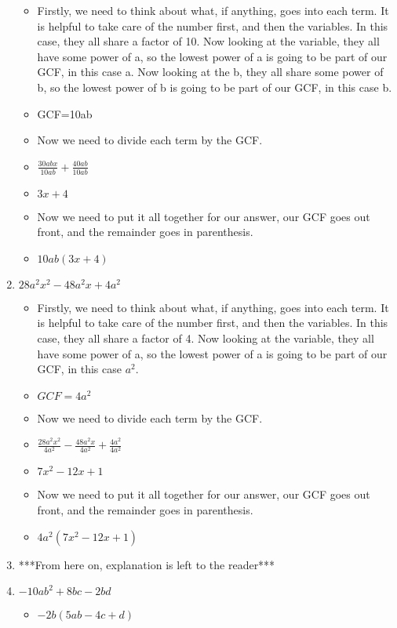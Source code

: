 \documentclass{article}
\begin{document}
\begin{enumerate}
\begin{itemize}
  \item Firstly, we need to think about what, if anything, goes into each term. It is helpful to take care of the number first, and then the variables. In this case, they all share a factor of 10. Now looking at the variable, they all have some power of a, so the lowest power of a is going to be part of our GCF, in this case a. Now looking at the b, they all share some power of b, so the lowest power of b is going to be part of our GCF, in this case b.
  \item [] GCF=10ab
  \item Now we need to divide each term by the GCF.
  \item [] {\Large $\frac{30abx}{10ab} + \frac{40ab}{10ab}$}
  \item [] $3x+4$
  \item Now we need to put it all together for our answer, our GCF goes out front, and the remainder goes in parenthesis.
  \item $10ab(3x+4)$ 
  \end{itemize}
\item $28a^{2}x^{2} - 48a^{2}x + 4a^{2}$
  \begin{itemize}
  \item Firstly, we need to think about what, if anything, goes into each term. It is helpful to take care of the number first, and then the variables. In this case, they all share a factor of 4. Now looking at the variable, they all have some power of a, so the lowest power of a is going to be part of our GCF, in this case $a^{2}$.
  \item [] $GCF=4a^{2}$
  \item Now we need to divide each term by the GCF.
  \item [] {\Large $\frac{28a^{2}x^{2}}{4a^{2}} - \frac{48a^{2}x}{4a^{2}} + \frac{4a^{2}}{4a^{2}}$}
  \item [] $7x^{2}-12x+1$
  \item Now we need to put it all together for our answer, our GCF goes out front, and the remainder goes in parenthesis.
  \item [] $4a^{2}(7x^{2}-12x+1)$
  \end{itemize}
\item [] ***From here on, explanation is left to the reader***
\item $-10ab^{2} + 8bc - 2bd$
  \begin{itemize}
  \item $-2b(5ab-4c+d)$
  \end{itemize}

\end{enumerate}
\end{document}
